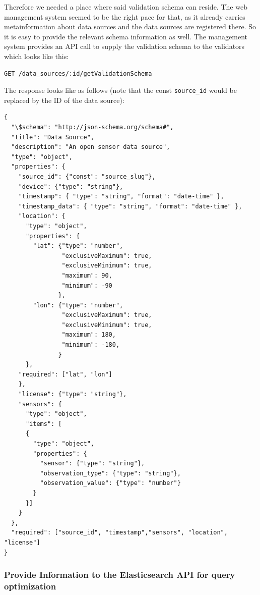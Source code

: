 Therefore we needed a place where said validation schema can reside. The
web management system seemed to be the right pace for that, as it
already carries metainformation about data sources and the data sources
are registered there. So it is easy to provide the relevant schema
information as well. The management system provides an API call to
supply the validation schema to the validators which looks like this:

\begin{verbatim}
GET /data_sources/:id/getValidationSchema
\end{verbatim}

The response looks like as follows (note that the const
\texttt{source\_id} would be replaced by the ID of the data source):

\begin{verbatim}
{
  "\$schema": "http://json-schema.org/schema#",
  "title": "Data Source",
  "description": "An open sensor data source",
  "type": "object",
  "properties": {
    "source_id": {"const": "source_slug"},
    "device": {"type": "string"},
    "timestamp": { "type": "string", "format": "date-time" },
    "timestamp_data": { "type": "string", "format": "date-time" },
    "location": {
      "type": "object",
      "properties": {
        "lat": {"type": "number",
                "exclusiveMaximum": true,
                "exclusiveMinimum": true,
                "maximum": 90,
                "minimum": -90
               },
        "lon": {"type": "number",
                "exclusiveMaximum": true,
                "exclusiveMinimum": true,
                "maximum": 180,
                "minimum": -180,
               }
      },
    "required": ["lat", "lon"]
    },
    "license": {"type": "string"},
    "sensors": {
      "type": "object",
      "items": [
      {
        "type": "object",
        "properties": {
          "sensor": {"type": "string"},
          "observation_type": {"type": "string"},
          "observation_value": {"type": "number"}
        }
      }]
    }
  },
  "required": ["source_id", "timestamp","sensors", "location", "license"]
}
\end{verbatim}

\subsubsection{Provide Information to the Elasticsearch API for query
optimization}\label{provide-information-to-the-elasticsearch-api-for-query-optimization}

